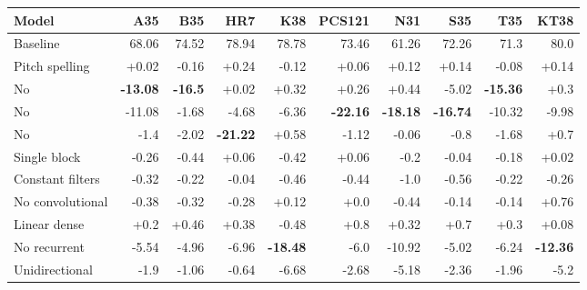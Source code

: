 \begin{tabular}{lrrrrrrrrr}
Model                                & A35             & B35            & HR7             & K38             & PCS121          & N31             & S35             & T35             & KT38            \\ \hline
Baseline                             & 68.06           & 74.52          & 78.94           & 78.78           & 73.46           & 61.26           & 72.26           & 71.3            & 80.0            \\
Pitch spelling                       & +0.02           & -0.16          & +0.24           & -0.12           & +0.06           & +0.12           & +0.14           & -0.08           & +0.14           \\
No \gls{bass19\}     & \textbf{-13.08} & \textbf{-16.5} & +0.02           & +0.32           & +0.26           & +0.44           & -5.02           & \textbf{-15.36} & +0.3            \\
No \gls{chroma19\}   & -11.08          & -1.68          & -4.68           & -6.36           & \textbf{-22.16} & \textbf{-18.18} & \textbf{-16.74} & -10.32          & -9.98           \\
No \gls{duration14\} & -1.4            & -2.02          & \textbf{-21.22} & +0.58           & -1.12           & -0.06           & -0.8            & -1.68           & +0.7            \\
Single block                         & -0.26           & -0.44          & +0.06           & -0.42           & +0.06           & -0.2            & -0.04           & -0.18           & +0.02           \\
Constant filters                     & -0.32           & -0.22          & -0.04           & -0.46           & -0.44           & -1.0            & -0.56           & -0.22           & -0.26           \\
No convolutional                     & -0.38           & -0.32          & -0.28           & +0.12           & +0.0            & -0.44           & -0.14           & -0.14           & +0.76           \\
Linear dense                         & +0.2            & +0.46          & +0.38           & -0.48           & +0.8            & +0.32           & +0.7            & +0.3            & +0.08           \\
No recurrent                         & -5.54           & -4.96          & -6.96           & \textbf{-18.48} & -6.0            & -10.92          & -5.02           & -6.24           & \textbf{-12.36} \\
Unidirectional                       & -1.9            & -1.06          & -0.64           & -6.68           & -2.68           & -5.18           & -2.36           & -1.96           & -5.2           
\end{tabular}


